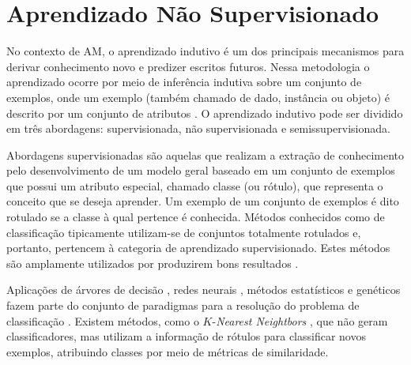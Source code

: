 \section{Aprendizado Não Supervisionado} \label{ChAM:naosupervisionado}

No contexto de AM, o aprendizado indutivo é um dos principais mecanismos para derivar conhecimento novo e predizer escritos futuros. Nessa metodologia o aprendizado ocorre por meio de inferência indutiva sobre um conjunto de exemplos, onde um exemplo (também chamado de dado, instância ou objeto) é descrito por um conjunto de atributos \cite{mitchell1997}. O aprendizado indutivo pode ser dividido em três abordagens: supervisionada, não supervisionada e semissupervisionada.

Abordagens supervisionadas são aquelas que realizam a extração de conhecimento pelo desenvolvimento de um modelo geral baseado em um conjunto de exemplos que possui um atributo especial, chamado classe (ou rótulo), que representa o conceito que se deseja aprender. Um exemplo de um conjunto de exemplos é dito rotulado se a classe à qual pertence é conhecida. Métodos conhecidos como de classificação tipicamente utilizam-se de conjuntos totalmente rotulados e, portanto, pertencem à categoria de aprendizado supervisionado. Estes métodos são amplamente utilizados por produzirem bons resultados \cite{Witten2005}.


Aplicações de árvores de decisão \cite{quinlan1986}, redes neurais \cite{bishop1995}, métodos estatísticos \cite{duda1973} e genéticos \cite{Goldberg1989} fazem parte do conjunto de paradigmas para a resolução do problema de classificação \cite{mitchell1997}. Existem métodos, como o $K$-\emph{Nearest Neightbors} \cite{cover1967}, que não geram classificadores, mas utilizam a informação de rótulos para classificar novos exemplos, atribuindo classes por meio de métricas de similaridade.

